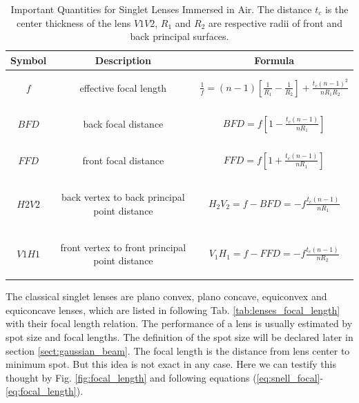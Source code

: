 \begin{table}[!ht]
\centering
\caption{Important Quantities for Singlet Lenses Immersed in Air. The distance $t_{c}$ is the center thickness of the lens $V1V2$,  $R_{1}$ and $R_{2}$ are respective radii of front and back principal surfaces\cite{lens_theory_LC_Ltd}.}
\begin{tabular}{|c|c|c|}
\hline
\textbf{Symbol}&\textbf{Description}&\textbf{Formula}\\
\hline
$f$ & \parbox[c]{6cm}{
						\begin{center}
						effective focal length
						\end{center}
				}& $\frac{1}{f}=(n-1)\left[\frac{1}{R_{1}}-\frac{1}{R_{2}} \right]+\frac{t_{c}(n-1)^2}{nR_{1}R_{2}}$ \\
\hline
$BFD$ &\parbox[c]{6cm}{
						\begin{center}
						back focal distance 
						\end{center}
			}& $BFD=f\left[ 1-\frac{t_{c}(n-1)}{nR_{1}}\right]$ \\
\hline
$FFD$ &\parbox[c]{6cm}{
						\begin{center}
						 front focal distance
						 \end{center} 
			}& $FFD=f\left[ 1+\frac{t_{c}(n-1)}{nR_{1}}\right]$ \\
\hline
$H2V2$ & \parbox[c]{6cm}{
						\begin{center}
						back vertex to back principal point distance
						\end{center}						
			} & $H_{2}V_{2}=f-BFD=-f\frac{t_{c}(n-1)}{nR_{1}}$ \\
\hline
$V1H1$ & \parbox[c]{6cm}{
						\begin{center}			
				    front vertex to front principal point distance
				    \end{center}
				 } & $V_{1}H_{1}=f-FFD=-f\frac{t_{c}(n-1)}{nR_{2}}$ \\
\hline
\end{tabular}
\label{tab:lens_quantities}
\end{table}

The classical singlet lenses are plano convex, plano concave, equiconvex and equiconcave lenses, which are listed in following Tab. \ref{tab:lenses_focal_length} with their focal length relation. The performance of a lens is usually estimated by spot size and focal lengths. The definition of the spot size will be declared later in section \ref{sect:gaussian_beam}. The focal length is the distance from lens center to minimum spot. But this idea is not exact in any case.  Here we can testify this thought by Fig. \ref{fig:focal_length} and following equations (\ref{eq:snell_focal}-\ref{eq:focal_length}).\\

